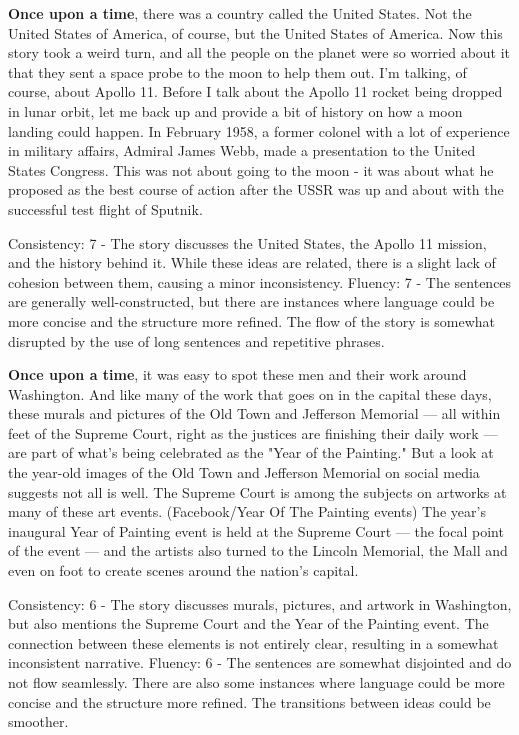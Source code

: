 \documentclass{article}
\begin{document}
\textbf{Once upon a time}, there was a country called the United States. Not the United States of America, of course, but the United States of America. Now this story took a weird turn, and all the people on the planet were so worried about it that they sent a space probe to the moon to help them out. I'm talking, of course, about Apollo 11. Before I talk about the Apollo 11 rocket being dropped in lunar orbit, let me back up and provide a bit of history on how a moon landing could happen. In February 1958, a former colonel with a lot of experience in military affairs, Admiral James Webb, made a presentation to the United States Congress. This was not about going to the moon - it was about what he proposed as the best course of action after the USSR was up and about with the successful test flight of Sputnik.

Consistency: 7 - The story discusses the United States, the Apollo 11 mission, and the history behind it. While these ideas are related, there is a slight lack of cohesion between them, causing a minor inconsistency.
Fluency: 7 - The sentences are generally well-constructed, but there are instances where language could be more concise and the structure more refined. The flow of the story is somewhat disrupted by the use of long sentences and repetitive phrases.

\textbf{Once upon a time}, it was easy to spot these men and their work around Washington. And like many of the work that goes on in the capital these days, these murals and pictures of the Old Town and Jefferson Memorial — all within feet of the Supreme Court, right as the justices are finishing their daily work — are part of what's being celebrated as the "Year of the Painting." But a look at the year-old images of the Old Town and Jefferson Memorial on social media suggests not all is well. The Supreme Court is among the subjects on artworks at many of these art events. (Facebook/Year Of The Painting events) The year's inaugural Year of Painting event is held at the Supreme Court — the focal point of the event — and the artists also turned to the Lincoln Memorial, the Mall and even on foot to create scenes around the nation's capital.

Consistency: 6 - The story discusses murals, pictures, and artwork in Washington, but also mentions the Supreme Court and the Year of the Painting event. The connection between these elements is not entirely clear, resulting in a somewhat inconsistent narrative.
Fluency: 6 - The sentences are somewhat disjointed and do not flow seamlessly. There are also some instances where language could be more concise and the structure more refined. The transitions between ideas could be smoother.
\end{document}
